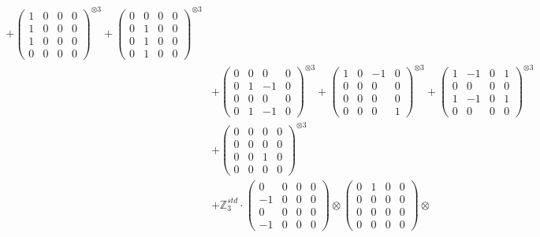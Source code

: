 \documentclass{article}
\begin{document}
{\begin{align}
            + \begin{pmatrix} 1 & 0 & 0 & 0 \\ 1 & 0 & 0 & 0 \\ 1 & 0 & 0 & 0 \\ 0 & 0 & 0 & 0 \end{pmatrix}^{\otimes 3} 
            + \begin{pmatrix} 0 & 0 & 0 & 0 \\ 0 & 1 & 0 & 0 \\ 0 & 1 & 0 & 0 \\ 0 & 1 & 0 & 0 \end{pmatrix}^{\otimes 3} \\
        &+ \label{Rs12-Rc12-Solution-1-c10} \begin{pmatrix} 0 & 0 & 0 & 0 \\ 0 & 1 & -1 & 0 \\ 0 & 0 & 0 & 0 \\ 0 & 1 & -1 & 0 \end{pmatrix}^{\otimes 3} 
            + \begin{pmatrix} 1 & 0 & -1 & 0 \\ 0 & 0 & 0 & 0 \\ 0 & 0 & 0 & 0 \\ 0 & 0 & 0 & 1 \end{pmatrix}^{\otimes 3} 
            + \begin{pmatrix} 1 & -1 & 0 & 1 \\ 0 & 0 & 0 & 0 \\ 1 & -1 & 0 & 1 \\ 0 & 0 & 0 & 0 \end{pmatrix}^{\otimes 3} \\
        &+ \label{Rs12-Rc12-Solution-1-c13} \begin{pmatrix} 0 & 0 & 0 & 0 \\ 0 & 0 & 0 & 0 \\ 0 & 0 & 1 & 0 \\ 0 & 0 & 0 & 0 \end{pmatrix}^{\otimes 3} \\
        &+ \label{Rs12-Rc12-Solution-1-c14} \mathbb{Z}_3^{std} \cdot 
            \begin{pmatrix} 0 & 0 & 0 & 0 \\ -1 & 0 & 0 & 0 \\ 0 & 0 & 0 & 0 \\ -1 & 0 & 0 & 0 \end{pmatrix} \otimes 
            \begin{pmatrix} 0 & 1 & 0 & 0 \\ 0 & 0 & 0 & 0 \\ 0 & 0 & 0 & 0 \\ 0 & 0 & 0 & 0 \end{pmatrix} \otimes 

\end{align}}
\end{document}
